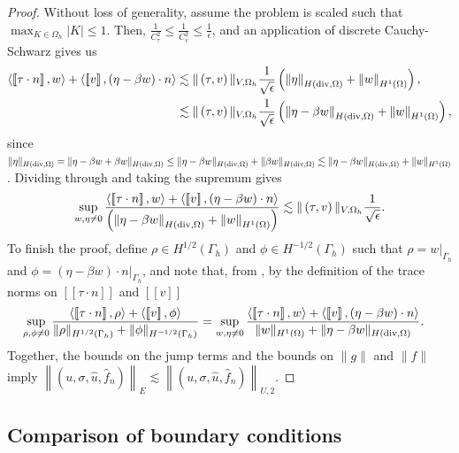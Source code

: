 \documentclass[11pt,onecolumn]{scrartcl}
\newcommand{\nor}[1]{\left\| #1 \right\|}
\newcommand{\LRs}[1]{\left[ #1 \right]}
\newcommand{\jump}[1] {\ensuremath{\LRs{\![#1]\!}}}
\newcommand{\Oh}{\Omega_h}
\begin{document}
\begin{proof}
Without loss of generality, assume the problem is scaled such that $\max_{K\in\Oh}|K| \leq 1$. Then, $\frac{1}{C_\tau^2}\leq \frac{1}{C_v^2} \leq \frac{1}{\epsilon}$, and an application of discrete Cauchy-Schwarz gives us 
\begin{align*}
\langle \jump{\tau\cdot n},w\rangle + \langle \jump{v},\left(\eta - \beta w\right)\cdot n\rangle &\lesssim \|\left(\tau,v\right)\|_{V,\Oh}\frac{1}{\sqrt{\epsilon}}\left(\nor{\eta}_{H({\rm div},\Omega)} + \nor{w}_{H^1(\Omega)}\right),\\
&\lesssim \|\left(\tau,v\right)\|_{V,\Oh}\frac{1}{\sqrt{\epsilon}}\left(\nor{\eta-\beta w}_{H({\rm div},\Omega)} + \nor{w}_{H^1(\Omega)}\right),
\end{align*}
since $\|\eta\|_{H({\rm div},\Omega)} = \|\eta - \beta w + \beta w\|_{H({\rm div},\Omega)} \leq \|\eta - \beta w\|_{H({\rm div},\Omega)} + \|\beta w\|_{H({\rm div},\Omega)} \lesssim \|\eta-\beta w\|_{H({\rm div},\Omega)} + \|w\|_{H^1(\Omega)}$.  Dividing through and taking the supremum gives
\[
\sup_{w,\eta \neq 0} \frac{\langle\jump{\tau\cdot n},w\rangle + \langle \jump{v},\left(\eta - \beta w\right)\cdot n\rangle}{\left(\nor{\eta-\beta w}_{H({\rm div},\Omega)} + \nor{w}_{H^1(\Omega)}\right)} \lesssim \|\left(\tau,v\right)\|_{V,\Oh}\frac{1}{\sqrt{\epsilon}}.
\]
To finish the proof, define $\rho \in H^{1/2}(\Gamma_h)$ and $\phi \in H^{-1/2}(\Gamma_h)$ such that $\rho = \left.w\right|_{\Gamma_h}$ and $\phi = \left.(\eta-\beta w)\cdot n\right|_{\Gamma_h}$, and note that, from \cite{analysisDPG}, by the definition of the trace norms on $\jump{\tau\cdot n}$ and $\jump{v}$ 
\begin{align*}
\sup_{\rho,\phi \neq 0} \frac{\langle \jump{\tau\cdot n},\rho\rangle + \langle \jump{v},\phi \rangle}{\|\rho\|_{H^{1/2}(\Gamma_h)}+\|\phi\|_{H^{-1/2}(\Gamma_h)}} &= \sup_{w,\eta \neq 0} \frac{\langle \jump{\tau\cdot n},w\rangle + \langle \jump{v},\left(\eta - \beta w\right)\cdot n\rangle}{ \|w\|_{H^1(\Omega)}+\|\eta-\beta w\|_{H({\rm div},\Omega)}}.
\end{align*}
Together, the bounds on the jump terms and the bounds on $\|g\|$ and $\|f\|$ imply $\left\|\left(u,\sigma,\widehat{u},\widehat{f}_n\right)\right\|_{E} \lesssim \left\|\left(u,\sigma,\widehat{u},\widehat{f}_n\right)\right\|_{U,2}$.
\end{proof}

\subsection{Comparison of boundary conditions}
\end{document}
